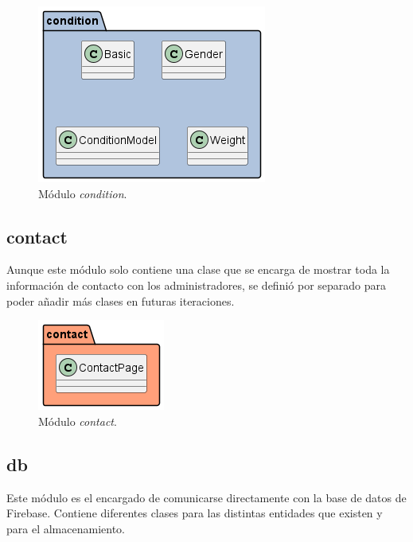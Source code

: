 \documentclass[a4paper, 12pt]{article}
\begin{document}
\begin{figure}[H]
	\begin{center}
		{\includegraphics[]{diagram/Condition.png}\par}
		\caption{Módulo \textit{condition}.}
	\end{center}
\end{figure}

\subsection*{contact}

Aunque este módulo solo contiene una clase que se encarga de mostrar toda la información de contacto con los administradores, se definió por separado para poder añadir más clases en futuras iteraciones.

\begin{figure}[H]
	\begin{center}
		{\includegraphics[]{diagram/Contact.png}\par}
		\caption{Módulo \textit{contact}.}
	\end{center}
\end{figure}


\subsection*{db}

Este módulo es el encargado de comunicarse directamente con la base de datos de Firebase. Contiene diferentes clases para las distintas entidades que existen y para el almacenamiento.
\end{document}
